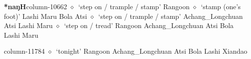   \item {\footnotesize \textbf{*naŋH}}{\tiny column-10662}
         $\diamond$~`step on / trample / stamp'
         Rangoon 
\hspace{1ex}
         $\diamond$~`stamp (one's foot)'
         Lashi 
\hspace{1ex}
         Maru 
\hspace{1ex}
         Bola 
\hspace{1ex}
         Atsi 
\hspace{1ex}
         $\diamond$~`step on / trample / stamp'
         Achang\_Longchuan 
\hspace{1ex}
         Atsi 
\hspace{1ex}
         Lashi 
\hspace{1ex}
         Maru 
\hspace{1ex}
         $\diamond$~`step on / tread'
         Rangoon 
\hspace{1ex}
         Achang\_Longchuan 
\hspace{1ex}
         Atsi 
\hspace{1ex}
         Bola 
\hspace{1ex}
         Lashi 
\hspace{1ex}
         Maru 
  \item {\footnotesize \textbf{}}{\tiny column-11784}
         $\diamond$~`tonight'
         Rangoon 
\hspace{1ex}
         Achang\_Longchuan 
\hspace{1ex}
         Atsi 
\hspace{1ex}
         Bola 
\hspace{1ex}
         Lashi 
\hspace{1ex}
         Xiandao 
